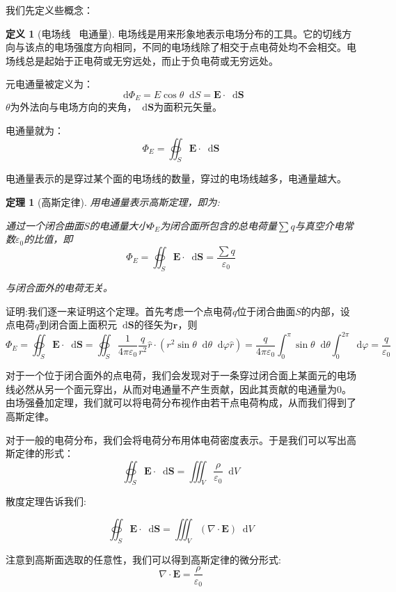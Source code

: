 \documentclass[12pt,a4paper,oneside]{report}
\newtheorem{theorem}{定理}[chapter]
\theoremstyle{definition}
\newtheorem{definition}{定义}[chapter]
\theoremstyle{remark}
\renewcommand{\d}{\mathop{}\!\mathrm{d}}
\begin{document}
我们先定义些概念：
\begin{definition}[电场线 \, 电通量]
  电场线是用来形象地表示电场分布的工具。它的切线方向与该点的电场强度方向相同，不同的电场线除了相交于点电荷处均不会相交。电场线总是起始于正电荷或无穷远处，而止于负电荷或无穷远处。

  元电通量被定义为：
  \[
  \d \Phi_E = E \cos\theta \d S = \mathbf{E} \cdot \d\mathbf{S}
  \]
$\theta$为外法向与电场方向的夹角，$\d\mathbf{S}$为面积元矢量。

电通量就为：
  \[
  \Phi_E = \oiint_S \mathbf{E} \cdot \d\mathbf{S}
  \]

电通量表示的是穿过某个面的电场线的数量，穿过的电场线越多，电通量越大。
\end{definition}
\begin{theorem}[高斯定律]
用电通量表示高斯定理，即为:

通过一个闭合曲面\textbf{$S$}的电通量大小\textbf{$\Phi_E$}为闭合面所包含的总电荷量$\sum q$与真空介电常数$\varepsilon_0$的比值，即
  \[
  \Phi_E = \oiint_S \mathbf{E} \cdot \d\mathbf{S} = \frac{\sum q}{\varepsilon_0}
  \]

  与闭合面外的电荷无关。
\end{theorem}

证明:我们逐一来证明这个定理。首先考虑一个点电荷$q$位于闭合曲面$S$的内部，设点电荷$q$到闭合面上面积元$\d\mathbf{S}$的径矢为$\mathbf{r}$，则
  \[
  \Phi_E = \oiint_S \mathbf{E} \cdot \d\mathbf{S}= \oiint_S \frac{1}{4\pi\varepsilon_0} \frac{q}{r^2}\hat{r} \cdot (r^2 \sin\theta \d \theta \d \varphi \hat{r}) = \frac{q}{4\pi\varepsilon_0} \int_0^{\pi} \sin\theta \d \theta \int_0^{2\pi} \d \varphi
  = \frac{q}{\varepsilon_0}
  \]

对于一个位于闭合面外的点电荷，我们会发现对于一条穿过闭合面上某面元的电场线必然从另一个面元穿出，从而对电通量不产生贡献，因此其贡献的电通量为0。
由场强叠加定理，我们就可以将电荷分布视作由若干点电荷构成，从而我们得到了高斯定律。

对于一般的电荷分布，我们会将电荷分布用体电荷密度表示。于是我们可以写出高斯定律的形式：
  \[
  \oiint_S \mathbf{E} \cdot \d\mathbf{S} = \iiint_V \frac{\rho}{\varepsilon_0} \d V
  \]

散度定理告诉我们:

\[
\oiint_S \mathbf{E} \cdot \d \mathbf{S} = \iiint_V (\nabla \cdot \mathbf{E}) \d V
\]

注意到高斯面选取的任意性，我们可以得到高斯定律的微分形式:
\[
\nabla \cdot \mathbf{E} = \frac{\rho}{\varepsilon_0}
\]
\end{document}
